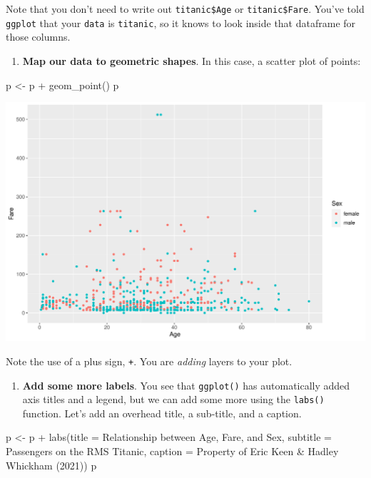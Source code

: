 \documentclass[
]{book}
\newenvironment{Shaded}{\begin{snugshade}}{\end{snugshade}}
\newcommand{\AttributeTok}[1]{\textcolor[rgb]{0.77,0.63,0.00}{#1}}
\newcommand{\FunctionTok}[1]{\textcolor[rgb]{0.00,0.00,0.00}{#1}}
\newcommand{\NormalTok}[1]{#1}
\newcommand{\OtherTok}[1]{\textcolor[rgb]{0.56,0.35,0.01}{#1}}
\newcommand{\SpecialCharTok}[1]{\textcolor[rgb]{0.00,0.00,0.00}{#1}}
\newcommand{\StringTok}[1]{\textcolor[rgb]{0.31,0.60,0.02}{#1}}
\providecommand{\tightlist}{%
  \setlength{\itemsep}{0pt}\setlength{\parskip}{0pt}}
\begin{document}
Note that you don't need to write out \texttt{titanic\$Age} or \texttt{titanic\$Fare}. You've told \texttt{ggplot} that your \texttt{data} is \texttt{titanic}, so it knows to look inside that dataframe for those columns.

\begin{enumerate}
\def\labelenumi{(\arabic{enumi})}
\setcounter{enumi}{3}
\tightlist
\item
  \textbf{Map our data to geometric shapes}. In this case, a scatter plot of points:
\end{enumerate}

\begin{Shaded}
\begin{Highlighting}[]
\NormalTok{p }\OtherTok{\textless{}{-}}\NormalTok{ p }\SpecialCharTok{+} \FunctionTok{geom\_point}\NormalTok{()}
\NormalTok{p}
\end{Highlighting}
\end{Shaded}

\includegraphics[width=694.08px]{figures/unnamed-chunk-160-1}

Note the use of a plus sign, \texttt{+}. You are \emph{adding} layers to your plot.

\begin{enumerate}
\def\labelenumi{(\arabic{enumi})}
\setcounter{enumi}{4}
\tightlist
\item
  \textbf{Add some more labels}. You see that \texttt{ggplot()} has automatically added axis titles and a legend, but we can add some more using the \texttt{labs()} function. Let's add an overhead title, a sub-title, and a caption.
\end{enumerate}

\begin{Shaded}
\begin{Highlighting}[]
\NormalTok{p }\OtherTok{\textless{}{-}}\NormalTok{ p }\SpecialCharTok{+} \FunctionTok{labs}\NormalTok{(}\AttributeTok{title =} \StringTok{\textquotesingle{}Relationship between Age, Fare, and Sex\textquotesingle{}}\NormalTok{,}
              \AttributeTok{subtitle =} \StringTok{\textquotesingle{}Passengers on the RMS Titanic\textquotesingle{}}\NormalTok{,}
              \AttributeTok{caption =} \StringTok{\textquotesingle{}Property of Eric Keen \& Hadley Whickham (2021)\textquotesingle{}}\NormalTok{)}
\NormalTok{p}
\end{Highlighting}
\end{Shaded}
\end{document}
